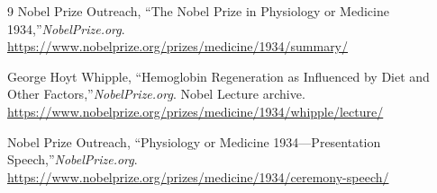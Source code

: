 \begin{thebibliography}{9}
Nobel Prize Outreach, ``The Nobel Prize in Physiology or Medicine 1934,''\emph{NobelPrize.org}.\newline
\url{https://www.nobelprize.org/prizes/medicine/1934/summary/}

George Hoyt Whipple, ``Hemoglobin Regeneration as Influenced by Diet and Other Factors,''\emph{NobelPrize.org}. Nobel Lecture archive.\newline
\url{https://www.nobelprize.org/prizes/medicine/1934/whipple/lecture/}

Nobel Prize Outreach, ``Physiology or Medicine 1934---Presentation Speech,''\emph{NobelPrize.org}.\newline
\url{https://www.nobelprize.org/prizes/medicine/1934/ceremony-speech/}
\end{thebibliography}
